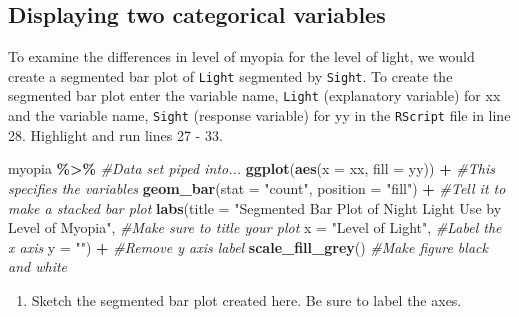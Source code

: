 \documentclass[
]{report}
\newenvironment{Shaded}{\begin{snugshade}}{\end{snugshade}}
\newcommand{\CommentTok}[1]{\textcolor[rgb]{0.56,0.35,0.01}{\textit{#1}}}
\newcommand{\DataTypeTok}[1]{\textcolor[rgb]{0.13,0.29,0.53}{#1}}
\newcommand{\KeywordTok}[1]{\textcolor[rgb]{0.13,0.29,0.53}{\textbf{#1}}}
\newcommand{\NormalTok}[1]{#1}
\newcommand{\OperatorTok}[1]{\textcolor[rgb]{0.81,0.36,0.00}{\textbf{#1}}}
\newcommand{\StringTok}[1]{\textcolor[rgb]{0.31,0.60,0.02}{#1}}
\providecommand{\tightlist}{%
  \setlength{\itemsep}{0pt}\setlength{\parskip}{0pt}}
\begin{document}
\vspace{1in}

\newpage

\hypertarget{displaying-two-categorical-variables}{%
\subsection*{Displaying two categorical variables}\label{displaying-two-categorical-variables}}

To examine the differences in level of myopia for the level of light, we would create a segmented bar plot of \texttt{Light} segmented by \texttt{Sight}. To create the segmented bar plot enter the variable name, \texttt{Light} (explanatory variable) for xx and the variable name, \texttt{Sight} (response variable) for yy in the \texttt{RScript} file in line 28. Highlight and run lines 27 - 33.

\begin{Shaded}
\begin{Highlighting}[]
\NormalTok{myopia }\OperatorTok{\%\textgreater{}\%}\StringTok{ }\CommentTok{\#Data set piped into...}
\KeywordTok{ggplot}\NormalTok{(}\KeywordTok{aes}\NormalTok{(}\DataTypeTok{x =}\NormalTok{ xx, }\DataTypeTok{fill =}\NormalTok{ yy)) }\OperatorTok{+}\StringTok{   }\CommentTok{\#This specifies the variables}
\StringTok{  }\KeywordTok{geom\_bar}\NormalTok{(}\DataTypeTok{stat =} \StringTok{"count"}\NormalTok{, }\DataTypeTok{position =} \StringTok{"fill"}\NormalTok{) }\OperatorTok{+}\StringTok{  }\CommentTok{\#Tell it to make a stacked bar plot}
\StringTok{  }\KeywordTok{labs}\NormalTok{(}\DataTypeTok{title =} \StringTok{"Segmented Bar Plot of Night Light Use by Level of Myopia"}\NormalTok{,  }\CommentTok{\#Make sure to title your plot }
       \DataTypeTok{x =} \StringTok{"Level of Light"}\NormalTok{,   }\CommentTok{\#Label the x axis}
       \DataTypeTok{y =} \StringTok{""}\NormalTok{) }\OperatorTok{+}\StringTok{  }\CommentTok{\#Remove y axis label}
\StringTok{    }\KeywordTok{scale\_fill\_grey}\NormalTok{()  }\CommentTok{\#Make figure black and white}
\end{Highlighting}
\end{Shaded}

\begin{enumerate}
\def\labelenumi{\arabic{enumi}.}
\setcounter{enumi}{3}
\tightlist
\item
  Sketch the segmented bar plot created here. Be sure to label the axes.
\end{enumerate}
\end{document}
